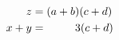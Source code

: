 \documentclass{article}
\begin{document}
\begin{align}
  z &= (a + b)(c + d)  \\
  x + y &= \hphantom{(a + b}3(c + d)
  \end{align}
  
\end{document}
